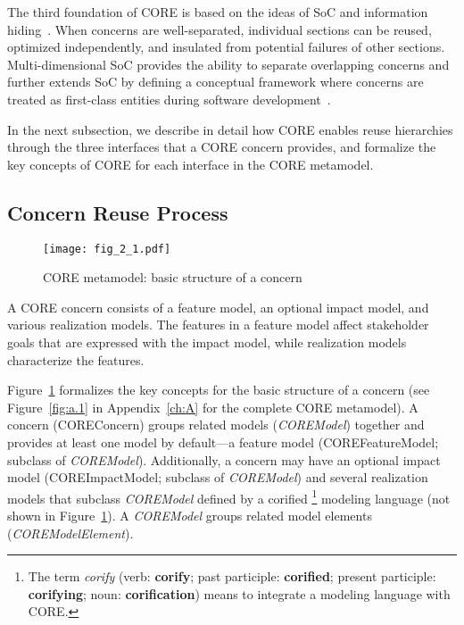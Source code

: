 The third foundation of CORE is based on the ideas of SoC and information hiding~\cite{dijkstra1976discipline, parnas1972criteria}. When concerns are well-separated, individual sections can be reused, optimized independently, and insulated from potential failures of other sections. Multi-dimensional SoC provides the ability to separate overlapping concerns and further extends SoC by defining a conceptual framework where concerns are treated as first-class entities during software development~\cite{tarr1999n}.

In the next subsection, we describe in detail how CORE enables reuse hierarchies through the three interfaces that a CORE concern provides, and formalize the key concepts of CORE for each interface in the CORE metamodel.

\subsection{Concern Reuse Process}

\begin{figure}
	\centering
	\texttt{[image: fig\_2\_1.pdf]}
	\caption{CORE metamodel: basic structure of a concern}
	\label{fig:2.1}
\end{figure}

A CORE concern consists of a feature model, an optional impact model, and various realization models. The features in a feature model affect stakeholder goals that are expressed with the impact model, while realization models characterize the features.

Figure~\ref{fig:2.1} formalizes the key concepts for the basic structure of a concern (see Figure~\ref{fig:a.1} in Appendix~\ref{ch:A} for the complete CORE metamodel). A concern ({\cls COREConcern}) groups related models (\textit{\cls COREModel}) together and provides at least one model by default---a feature model ({\cls COREFeatureModel}; subclass of \textit{\cls COREModel}). Additionally, a concern may have an optional impact model ({\cls COREImpactModel}; subclass of \textit{\cls COREModel}) and several realization models that subclass \textit{\cls COREModel} defined by a corified \footnote{The term \emph{corify} (verb: \textbf{corify}; past participle: \textbf{corified}; present participle: \textbf{corifying}; noun: \textbf{corification}) means to integrate a modeling language with CORE.} modeling language (not shown in Figure~\ref{fig:2.1}). A \textit{\cls COREModel} groups related model elements (\textit{\cls COREModelElement}).

